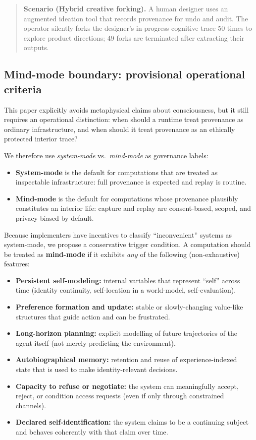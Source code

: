 \documentclass{aion}
\begin{document}
\begin{quote}\small
\textbf{Scenario (Hybrid creative forking).}
A human designer uses an augmented ideation tool that records provenance for undo and audit.
The operator silently forks the designer's in-progress cognitive trace 50 times to explore product directions; 49 forks are terminated after extracting their outputs.
\end{quote}

\subsection{Mind-mode boundary: provisional operational criteria}
\label{sec:mindmode}

This paper explicitly avoids metaphysical claims about consciousness, but it
still requires an operational distinction:
when should a runtime treat provenance as ordinary infrastructure, and when
should it treat provenance as an ethically protected interior trace?

We therefore use \emph{system-mode} vs.\ \emph{mind-mode} as governance labels:
\begin{itemize}[leftmargin=*]
  \item \textbf{System-mode} is the default for computations that are treated as
    inspectable infrastructure: full provenance is expected and replay is routine.
  \item \textbf{Mind-mode} is the default for computations whose provenance plausibly
    constitutes an interior life: capture and replay are consent-based, scoped, and
    privacy-biased by default.
\end{itemize}

Because implementers have incentives to classify ``inconvenient'' systems as
system-mode, we propose a conservative trigger condition.
A computation should be treated as \textbf{mind-mode} if it exhibits \emph{any}
of the following (non-exhaustive) features:

\begin{itemize}[leftmargin=*]
  \item \textbf{Persistent self-modeling:} internal variables that represent ``self''
    across time (identity continuity, self-location in a world-model, self-evaluation).
  \item \textbf{Preference formation and update:} stable or slowly-changing value-like
    structures that guide action and can be frustrated.
  \item \textbf{Long-horizon planning:} explicit modelling of future trajectories of
    the agent itself (not merely predicting the environment).
  \item \textbf{Autobiographical memory:} retention and reuse of experience-indexed
    state that is used to make identity-relevant decisions.
  \item \textbf{Capacity to refuse or negotiate:} the system can meaningfully accept,
    reject, or condition access requests (even if only through constrained channels).
  \item \textbf{Declared self-identification:} the system claims to be a continuing
    subject and behaves coherently with that claim over time.
\end{itemize}
\end{document}
